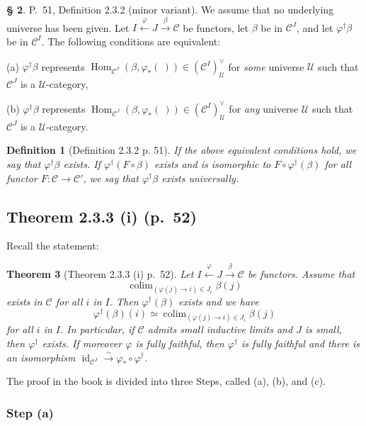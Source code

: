 \documentclass[12pt]{article}
\newtheorem{thm}{Theorem}
\newtheorem{df}[thm]{Definition}
\theoremstyle{remark}
\theoremstyle{definition}
\newtheorem{s}[thm]{\S}
\newcommand{\nn}{\noindent}
\newcommand{\C}{\mathcal C}
\newcommand{\U}{\mathcal U}
\newcommand{\pp}{\varphi}
\newcommand{\xr}{\xrightarrow}
\DeclareMathOperator*{\colim}{colim}
\DeclareMathOperator{\id}{id}
\DeclareMathOperator{\Hom}{Hom}
\begin{document}
%

\begin{s} 
P.~51, Definition 2.3.2 (minor variant). We assume that no underlying universe has been given. Let $I\xleftarrow\pp J\xr\beta\C$ be functors, let $\beta$ be in $\C^J$, and let $\pp^\dagger\beta$ be in $\C^I$. The following conditions are equivalent:

\nn(a) $\pp^\dagger\beta$ represents $\Hom_{\C^J}(\beta,\pp_*(\ ))\in(\C^I)^\vee_\U$ for \emph{some} universe $\U$ such that $\C^J$ is a $\U$-category,

\nn(b) $\pp^\dagger\beta$ represents $\Hom_{\C^J}(\beta,\pp_*(\ ))\in(\C^I)^\vee_\U$ for \emph{any} universe $\U$ such that $\C^J$ is a $\U$-category. 

\begin{df}[Definition 2.3.2 p. 51]\label{232} 
If the above equivalent conditions hold, we say that $\pp^\dagger\beta$ {\em exists}. If $\pp^\dagger(F\circ\beta)$ exists and is isomorphic to $F\circ\pp^\dagger(\beta)$ for all functor $F:\C\to\C'$, we say that $\pp^\dagger\beta$ exists {\em universally}.
\end{df}
\end{s}


\subsection{Theorem 2.3.3 (i) (p.~52)}

Recall the statement: 

\begin{thm}[Theorem 2.3.3 (i) p.~52]\label{233i}
Let $I\xleftarrow\pp J\xr\beta\C$ be functors. Assume that 
$$
\colim_{(\pp(j)\to i)\in J_i}\beta(j)
$$ 
exists in $\C$ for all $i$ in $I$. Then $\pp^\dagger(\beta)$ exists and we have 
%
\begin{equation}\label{236}
\pp^\dagger(\beta)(i)\simeq\colim_{(\pp(j)\to i)\in J_i}\beta(j)
\end{equation} 
%
for all $i$ in $I$. In particular, if $\C$ admits small inductive limits and $J$ is small, then 
$\pp^\dagger$ exists. If moreover $\pp$ is fully faithful, then $\pp^\dagger$ is fully faithful and there is an isomorphism $\id_{\C^J}\xr\sim\pp_*\circ\pp^\dagger$. 
\end{thm}
The proof in the book is divided into three Steps, called (a), (b), and (c). 

%

\subsubsection{Step (a)}\label{scji}
\end{document}

